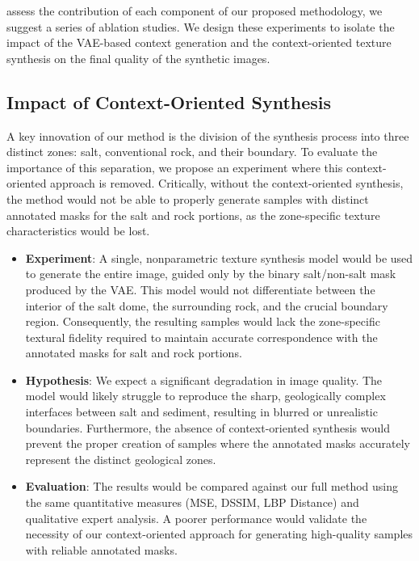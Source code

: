 \documentclass{ieeeaccess}
\begin{document}
 assess the contribution of each component of our proposed methodology, we suggest a series of ablation studies. We design these experiments to isolate the impact of the VAE-based context generation and the context-oriented texture synthesis on the final quality of the synthetic images.

\subsection{Impact of Context-Oriented Synthesis}

A key innovation of our method is the division of the synthesis process into three distinct zones: salt, conventional rock, and their boundary. To evaluate the importance of this separation, we propose an experiment where this context-oriented approach is removed. Critically, without the context-oriented synthesis, the method would not be able to properly generate samples with distinct annotated masks for the salt and rock portions, as the zone-specific texture characteristics would be lost.

\begin{itemize}
    \item \textbf{Experiment}: A single, nonparametric texture synthesis model would be used to generate the entire image, guided only by the binary salt/non-salt mask produced by the VAE. This model would not differentiate between the interior of the salt dome, the surrounding rock, and the crucial boundary region. Consequently, the resulting samples would lack the zone-specific textural fidelity required to maintain accurate correspondence with the annotated masks for salt and rock portions.
    \item \textbf{Hypothesis}: We expect a significant degradation in image quality. The model would likely struggle to reproduce the sharp, geologically complex interfaces between salt and sediment, resulting in blurred or unrealistic boundaries. Furthermore, the absence of context-oriented synthesis would prevent the proper creation of samples where the annotated masks accurately represent the distinct geological zones.
    \item \textbf{Evaluation}: The results would be compared against our full method using the same quantitative measures (MSE, DSSIM, LBP Distance) and qualitative expert analysis. A poorer performance would validate the necessity of our context-oriented approach for generating high-quality samples with reliable annotated masks.
\end{itemize}
\end{document}
